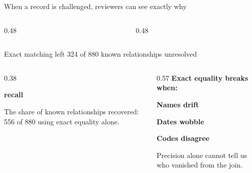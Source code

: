 \documentclass[aspectratio=169,12pt]{beamer}
\begin{document}
\begin{frame}{When a record is challenged, reviewers can see exactly why}
  \vspace{0.15cm}
  \begin{columns}[T,onlytextwidth]
    \begin{column}{0.48\textwidth}
      \vspace{0.20cm}

    \end{column}
    \begin{column}{0.48\textwidth}
      \vspace{0.20cm}

    \end{column}
  \end{columns}
\end{frame}

\begin{frame}{Exact matching left 324 of 880 known relationships unresolved}
  \begin{columns}[c,onlytextwidth]
    \begin{column}{0.38\textwidth}
      \par
      {\fontsize{18}{22}\selectfont\bfseries recall}\par
      \vspace{0.22cm}
      {\fontsize{14}{18}\selectfont\color{Slate}The share of known relationships recovered: 556 of 880 using exact equality alone.}
    \end{column}
    \begin{column}{0.57\textwidth}
      {\fontsize{18}{23}\selectfont\bfseries Exact equality breaks when:}\par
      \vspace{0.25cm}
      {\fontsize{16}{21}\selectfont
      \textcolor{AuditRed}{\textbf{Names drift}}\par
      \textcolor{EvidenceAmber}{\textbf{Dates wobble}}\par
      \textcolor{CivicBlue}{\textbf{Codes disagree}}\par
      \vspace{0.42cm}
      \color{Slate}Precision alone cannot tell us who vanished from the join.}
    \end{column}
  \end{columns}
\end{frame}
\end{document}
